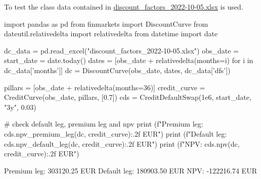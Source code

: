 To test the class data contained in \href{https://github.com/matteosan1/finance_course/raw/master/input_files/discount_factors_2022-10-05.xlsx}{discount\_factors\_2022-10-05.xlsx} is used.

\begin{ipython}
import pandas as pd
from finmarkets import DiscountCurve
from dateutil.relativedelta import relativedelta
from datetime import date

dc_data = pd.read_excel("discount_factors_2022-10-05.xlsx")
obs_date = start_date = date.today() 
dates = [obs_date + relativedelta(months=i) for i in dc_data['months']]
dc = DiscountCurve(obs_date, dates, dc_data['dfs'])

pillars = [obs_date + relativedelta(months=36)]
credit_curve = CreditCurve(obs_date, pillars, [0.7])
cds = CreditDefaultSwap(1e6, start_date, "3y", 0.03)

# check default leg, premium leg and npv
print (f"Premium leg: {cds.npv_premium_leg(dc, credit_curve):.2f} EUR")
print (f"Default leg: {cds.npv_default_leg(dc, credit_curve):.2f} EUR")
print (f"NPV: {cds.npv(dc, credit_curve):.2f} EUR")
\end{ipython}
\begin{ioutput}
Premium leg: 303120.25 EUR
Default leg: 180903.50 EUR
NPV: -122216.74 EUR
\end{ioutput}
	
